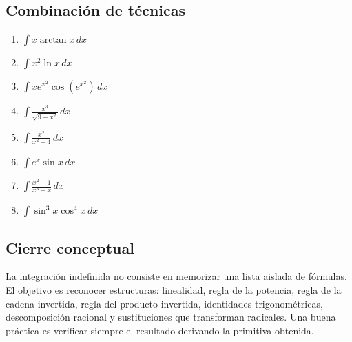 \documentclass[12pt]{article}
\theoremstyle{definition}
\theoremstyle{remark}
\begin{document}
\subsection{Combinación de técnicas}
\begin{enumerate}[label=\arabic*.,start=225]
\item $\displaystyle \int x\arctan x\,dx$
\item $\displaystyle \int x^2\ln x\,dx$
\item $\displaystyle \int x e^{x^2}\cos(e^{x^2})\,dx$
\item $\displaystyle \int \frac{x^3}{\sqrt{9-x^2}}\,dx$
\item $\displaystyle \int \frac{x^2}{x^2+4}\,dx$
\item $\displaystyle \int e^x\sin x\,dx$
\item $\displaystyle \int \frac{x^2+1}{x^3+x}\,dx$
\item $\displaystyle \int \sin^3x\cos^4x\,dx$
\end{enumerate}

\subsection{Cierre conceptual}
La integración indefinida no consiste en memorizar una lista aislada de fórmulas. El objetivo es reconocer estructuras: linealidad, regla de la potencia, regla de la cadena invertida, regla del producto invertida, identidades trigonométricas, descomposición racional y sustituciones que transforman radicales. Una buena práctica es verificar siempre el resultado derivando la primitiva obtenida.
\end{document}
